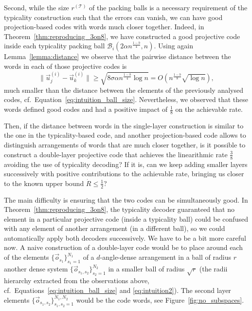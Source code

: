 \documentclass[10pt,conference]{IEEEtran}
\newcommand{\1}{\mathds{1}}
\newcommand{\cB}{\mathcal{B}}
\newcommand{\cT}{\mathcal{T}}
\begin{document}
Second, while the size $r^{(\cT)}$ of the packing balls is a necessary requirement of the typicality construction such that the errors can vanish, we can have good projection-based codes with words much closer together. Indeed, in Theorem~\ref{thm:reproducing_3on8}, we have constructed a good projective code inside each typicality packing ball $\cB_i(2\alpha n^\frac{1-b}{4},n)$. Using again Lemma~\ref{lemma:distance} we observe that the pairwise distance between the words in each of those projective codes is
\begin{equation}\label{eq:intuition2}
    \|\vec{u}_j^{(i)}-\vec{u}_k^{(i)}\|\geq\sqrt{8\sigma \alpha n^\frac{1-b}{4}\log n}=O\left(n^\frac{1-b}{8}\sqrt{\log n}\right),
\end{equation}
much smaller than the distance between the elements of the previously analysed codes, cf.~Equation~\eqref{eq:intuition_ball_size}. Nevertheless, we observed that these words defined good codes and had a positive impact of $\frac18$ on the achievable rate. 

Then, if the distance between words in the single-layer construction is similar to the one in the typicality-based code, and another projection-based code allows to distinguish arrangements of words that are much closer together, 
is it possible to construct a double-layer projective code that achieves the linearithmic rate $\frac38$ avoiding the use of typicality decoding? If it is, can we keep adding smaller layers successively with positive contributions to the achievable rate, bringing us closer to the known upper bound $\dot R\leq\frac12$?

The main difficulty is ensuring that the two codes can be simultaneously good. In Theorem~\ref{thm:reproducing_3on8}, the typicality decoder guaranteed that no element in a particular projective code (inside a typicality ball) could be confused with any element of another arrangement (in a different ball), so we could automatically apply both decoders successively. We have to be a bit more careful now.
%
A naive construction of a double-layer code would be to place around each of the elements $\{\vec o_{s_1}\}_{s_1=1}^{N_1}$ of a $d$-angle-dense arrangement in a ball of radius $r$ another dense system $\{\vec o_{s_1,s_2}\}_{s_2=1}^{N_2}$ in a smaller ball of radius $\sqrt{r}$ (the radii hierarchy extracted from the observations above, cf.~Equations~\ref{eq:intuition_ball_size} and \eqref{eq:intuition2}). The second layer elements $\{\vec o_{s_1,s_2}\}_{s_1,s_2=1}^{N_1,N_2}$ would be the code words, see Figure~\ref{fig:no_subspaces}. 
\end{document}

